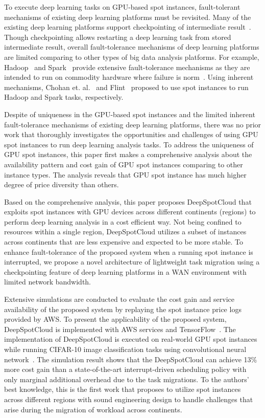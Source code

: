 \documentclass[conference]{IEEEtran}
\begin{document}
To execute deep learning tasks on GPU-based spot instances, fault-tolerant mechanisms of existing deep learning platforms must be revisited. Many of the existing deep learning platforms support checkpointing of intermediate result~\cite{tensorflow,mariana,poseidon}. Though checkpointing allows restarting a deep learning task from stored intermediate result, overall fault-tolerance mechanisms of deep learning platforms are limited comparing to other types of big data analysis platforms. For example, Hadoop~\cite{hadoop} and Spark~\cite{spark} provide extensive fault-tolerance mechanisms as they are intended to run on commodity hardware where failure is norm~\cite{google_mapreduce,late}. Using inherent mechanisms, Chohan et. al.~\cite{see-spot-run} and Flint~\cite{flint} proposed to use spot instances to run Hadoop and Spark tasks, respectively. 

Despite of uniqueness in the GPU-based spot instances and the limited inherent fault-tolerance mechanisms of existing deep learning platforms, there was no prior work that thoroughly investigates the opportunities and challenges of using GPU spot instances to run deep learning analysis tasks. To address the uniqueness of GPU spot instances, this paper first makes a comprehensive analysis about the availability pattern and cost gain of GPU spot instances comparing to other instance types. The analysis reveals that GPU spot instance has much higher degree of price diversity than others.

Based on the comprehensive analysis, this paper proposes DeepSpotCloud that exploits spot instances with GPU devices across different continents (regions) to perform deep learning analysis in a cost efficient way. Not being confined to resources within a single region, DeepSpotCloud utilizes a subset of instances across continents that are less expensive and expected to be more stable. To enhance fault-tolerance of the proposed system when a running spot instance is interrupted, we propose a novel architecture of lightweight task migration using a checkpointing feature of deep learning platforms in a WAN environment with limited network bandwidth. 

Extensive simulations are conducted to evaluate the cost gain and service availability of the proposed system by replaying the spot instance price logs provided by AWS. To present the applicability of the proposed system, DeepSpotCloud is implemented with AWS services and TensorFlow~\cite{tensorflow}. The implementation of DeepSpotCloud is executed on real-world GPU spot instances while running CIFAR-10 image classification tasks using convolutional neural network~\cite{cifar10}. The simulation result shows that the DeepSpotCloud can achieve 13\% more cost gain than a state-of-the-art interrupt-driven scheduling policy with only marginal additional overhead due to the task migrations. To the authors' best knowledge, this is the first work that proposes to utilize spot instances across different regions with sound engineering design to handle challenges that arise during the migration of workload across continents.
\end{document}
